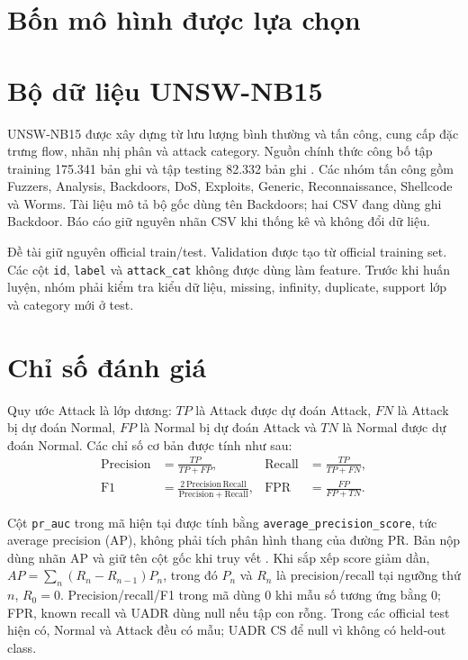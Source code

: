 \documentclass[12pt,a4paper,oneside]{report}
\begin{document}
\section{Bốn mô hình được lựa chọn}


\section{Bộ dữ liệu UNSW-NB15}

UNSW-NB15 được xây dựng từ lưu lượng bình thường và tấn công, cung cấp đặc trưng flow, nhãn nhị phân và attack category. Nguồn chính thức công bố tập training 175.341 bản ghi và tập testing 82.332 bản ghi \cite{unswsite,moustafa2015}. Các nhóm tấn công gồm Fuzzers, Analysis, Backdoors, DoS, Exploits, Generic, Reconnaissance, Shellcode và Worms. Tài liệu mô tả bộ gốc dùng tên Backdoors; hai CSV đang dùng ghi Backdoor. Báo cáo giữ nguyên nhãn CSV khi thống kê và không đổi dữ liệu.

Đề tài giữ nguyên official train/test. Validation được tạo từ official training set. Các cột \texttt{id}, \texttt{label} và \texttt{attack\_cat} không được dùng làm feature. Trước khi huấn luyện, nhóm phải kiểm tra kiểu dữ liệu, missing, infinity, duplicate, support lớp và category mới ở test.

\section{Chỉ số đánh giá}

Quy ước Attack là lớp dương: $TP$ là Attack được dự đoán Attack, $FN$ là Attack bị dự đoán Normal, $FP$ là Normal bị dự đoán Attack và $TN$ là Normal được dự đoán Normal. Các chỉ số cơ bản được tính như sau:
\begin{align}
\mathrm{Precision} &= \frac{TP}{TP+FP}, &
\mathrm{Recall} &= \frac{TP}{TP+FN},\\
\mathrm{F1} &= \frac{2\,\mathrm{Precision}\,\mathrm{Recall}}
{\mathrm{Precision}+\mathrm{Recall}}, &
\mathrm{FPR} &= \frac{FP}{FP+TN}.
\end{align}

Cột \texttt{pr\_auc} trong mã hiện tại được tính bằng \texttt{average\_precision\_score}, tức average precision (AP), không phải tích phân hình thang của đường PR. Bản nộp dùng nhãn AP và giữ tên cột gốc khi truy vết \cite{saito2015,davis2006}. Khi sắp xếp score giảm dần, $AP=\sum_n(R_n-R_{n-1})P_n$, trong đó $P_n$ và $R_n$ là precision/recall tại ngưỡng thứ $n$, $R_0=0$. Precision/recall/F1 trong mã dùng 0 khi mẫu số tương ứng bằng 0; FPR, known recall và UADR dùng null nếu tập con rỗng. Trong các official test hiện có, Normal và Attack đều có mẫu; UADR CS để null vì không có held-out class.
\end{document}
